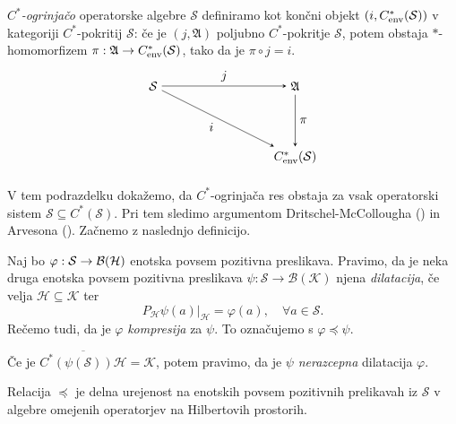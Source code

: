\begin{definicija}
    \emph{$C^*$-ogrinjačo} operatorske algebre $\mathcal{S}$ definiramo kot končni objekt $(i, C_{\operatorname{env}} ^* (\mathcal{S}))$ v kategoriji $C^*$-pokritij $\mathcal{S}$:
    če je $(j, \mathfrak{A})$ poljubno $C^*$-pokritje $\mathcal{S}$, potem obstaja $*$-homomorfizem $\pi: \mathfrak{A} \to C_{\operatorname{env}} ^* (\mathcal{S})$,
    tako da je $\pi \circ j = i$.
    \begin{equation*}
        \begin{tikzpicture}[>=stealth]

        \node (S) at (0,2) {$\mathcal{S}$};
        \node (A) at (4,2) {$\mathfrak{A}$};
        \node (Q) at (4,0) {$C^* _{\env} (\mathcal{S})$};
        
        \draw[->]  (S) -- node[above] {$j$} (A);
        
        \draw[->] (S) -- node[below left] {$i$} (Q);
        
        \draw[->] (A) -- node[right] {$\pi$} (Q);
        
        \end{tikzpicture}    
    \end{equation*}
\end{definicija}

V tem podrazdelku dokažemo, da $C^*$-ogrinjača res obstaja za vsak operatorski sistem $\mathcal{S} \subseteq C^*(\mathcal{S})$.
Pri tem sledimo argumentom Dritschel-McCollougha (\cite{dritschel2005}) in Arvesona (\cite{arveson2003}).
Začnemo z naslednjo definicijo.

\begin{definicija}
    Naj bo $\varphi: \mathcal{S} \to \operatorname{\mathcal{B} (\mathcal{H})}$ enotska povsem pozitivna preslikava.
    Pravimo, da je neka druga enotska povsem pozitivna preslikava $\psi: \mathcal{S} \to \mathcal{B}(\mathcal{K})$ njena \emph{dilatacija},
    če velja $\mathcal{H} \subseteq \mathcal{K}$ ter 
    $$P_{\mathcal{H} } \psi (a) |_{\mathcal{H}} = \varphi (a),\quad \forall a \in \mathcal{S}.$$
    Rečemo tudi, da je $\varphi$ \emph{kompresija} za $\psi$. To označujemo s $\varphi \preceq \psi$.

    Če je $ \overline{C^* (\psi (\mathcal{S})) \mathcal{H}} = \mathcal{K}$,
    potem pravimo, da je $\psi$ \emph{nerazcepna} dilatacija $\varphi$.
\end{definicija}

\begin{opomba}
    Relacija $\preceq$ je delna urejenost na enotskih povsem pozitivnih prelikavah iz $\mathcal{S}$ v algebre omejenih operatorjev na Hilbertovih prostorih.
\end{opomba}

